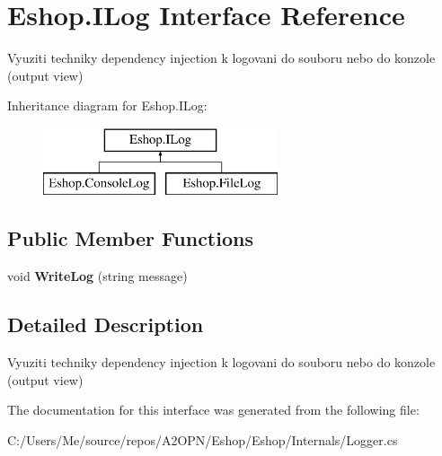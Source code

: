 \hypertarget{interface_eshop_1_1_i_log}{}\section{Eshop.\+I\+Log Interface Reference}
\label{interface_eshop_1_1_i_log}


Vyuziti techniky dependency injection k logovani do souboru nebo do konzole (output view)  


Inheritance diagram for Eshop.\+I\+Log\+:\begin{figure}[H]
\begin{center}
\leavevmode
\includegraphics[height=2.000000cm]{interface_eshop_1_1_i_log}
\end{center}
\end{figure}
\subsection*{Public Member Functions}
\begin{DoxyCompactItemize}
\item 
\mbox{\label{interface_eshop_1_1_i_log_a38a7bbfb37c08c7a745935bd71bfdc69}} 
void {\bfseries Write\+Log} (string message)
\end{DoxyCompactItemize}


\subsection{Detailed Description}
Vyuziti techniky dependency injection k logovani do souboru nebo do konzole (output view) 



The documentation for this interface was generated from the following file\+:\begin{DoxyCompactItemize}
\item 
C\+:/\+Users/\+Me/source/repos/\+A2\+O\+P\+N/\+Eshop/\+Eshop/\+Internals/Logger.\+cs\end{DoxyCompactItemize}

